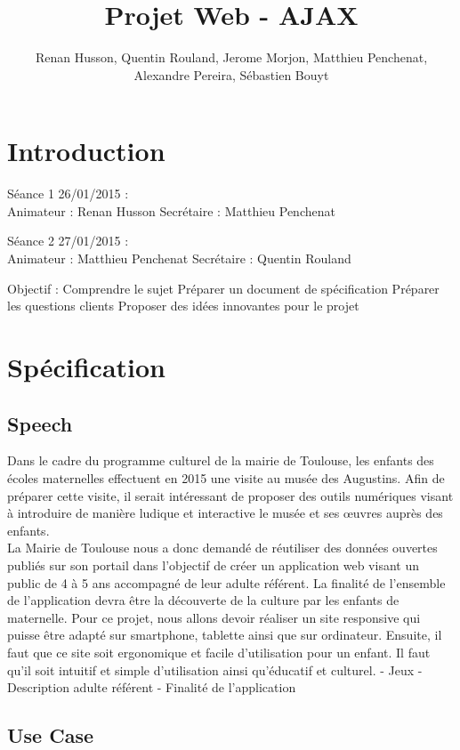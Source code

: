 \documentclass[12pt,a4paper]{report}
\author{Renan Husson, Quentin Rouland, Jerome Morjon, Matthieu Penchenat, Alexandre Pereira, Sébastien Bouyt}
\affil{Université Toulouse, Jean Jaurès - L3 MIASHS \\ Document D1 : Specification Fonctionnelle}
\begin{document}
\title{Projet Web - AJAX}
\maketitle
\renewcommand{\contentsname}{Sommaire}
\tableofcontents
\chapter*{Introduction}
Séance 1 26/01/2015 : \\
Animateur : Renan Husson
Secrétaire : Matthieu Penchenat
\newline

Séance 2 27/01/2015 : \\
Animateur : Matthieu Penchenat
Secrétaire : Quentin Rouland
\newline

Objectif :
Comprendre le sujet
Préparer un document de spécification
Préparer les questions clients
Proposer des idées innovantes pour le projet
\chapter{Spécification}

\section{Speech}
Dans le cadre du programme culturel de la mairie de Toulouse, les enfants des écoles maternelles effectuent en 2015 une visite au musée des Augustins. Afin de préparer cette visite, il serait intéressant de proposer des outils numériques visant à introduire de manière ludique et interactive le musée et ses œuvres auprès des enfants.\\
La Mairie de Toulouse nous a donc demandé de réutiliser des données ouvertes publiés sur son portail dans l'objectif de créer un application web visant un public de 4 à 5 ans accompagné de leur adulte référent. La finalité de l'ensemble de l'application devra être la découverte de la culture par les enfants de maternelle.
Pour ce projet, nous allons devoir réaliser un site responsive qui puisse être adapté sur smartphone, tablette ainsi que sur ordinateur. Ensuite, il faut que ce site soit ergonomique et facile d'utilisation pour un enfant. Il faut qu'il soit intuitif et simple d'utilisation ainsi qu'éducatif et culturel.
- Jeux
- Description adulte référent
- Finalité de l'application


\section{Use Case}
\end{document}
